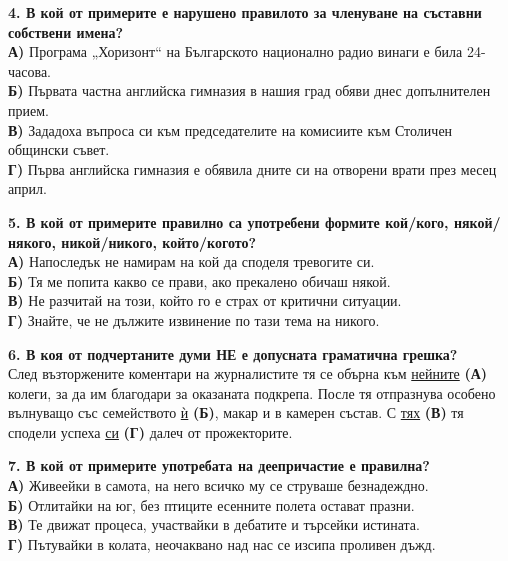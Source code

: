 \documentclass[12pt,a4paper]{article}
\begin{document}
\vspace{0.6cm}

\noindent
\textbf{4. В кой от примерите е нарушено правилото за членуване на съставни собствени имена?} \\
\textbf{А)} Програма „Хоризонт“ на Българското национално радио винаги е била 24-часова. \\
\textbf{Б)} Първата частна английска гимназия в нашия град обяви днес допълнителен прием. \\
\textbf{В)} Зададоха въпроса си към председателите на комисиите към Столичен общински съвет. \\
\textbf{Г)} Първа английска гимназия е обявила дните си на отворени врати през месец април.

\vspace{0.6cm}

\noindent
\textbf{5. В кой от примерите правилно са употребени формите кой/кого, някой/някого, никой/никого, който/когото?} \\
\textbf{А)} Напоследък не намирам на кой да споделя тревогите си. \\
\textbf{Б)} Тя ме попита какво се прави, ако прекалено обичаш някой. \\
\textbf{В)} Не разчитай на този, който го е страх от критични ситуации. \\
\textbf{Г)} Знайте, че не дължите извинение по тази тема на никого.

\vspace{0.6cm}

\noindent
\textbf{6. В коя от подчертаните думи НЕ е допусната граматична грешка?} \\
След възторжените коментари на журналистите тя се обърна към \underline{нейните} \textbf{(А)} колеги, за да им благодари за оказаната подкрепа. После тя отпразнува особено вълнуващо със семейството \underline{ѝ} \textbf{(Б)}, макар и в камерен състав. С \underline{тях} \textbf{(В)} тя сподели успеха \underline{си} \textbf{(Г)} далеч от прожекторите.

\vspace{0.6cm}

\noindent
\textbf{7. В кой от примерите употребата на деепричастие е правилна?} \\
\textbf{А)} Живеейки в самота, на него всичко му се струваше безнадеждно. \\
\textbf{Б)} Отлитайки на юг, без птиците есенните полета остават празни. \\
\textbf{В)} Те движат процеса, участвайки в дебатите и търсейки истината. \\
\textbf{Г)} Пътувайки в колата, неочаквано над нас се изсипа проливен дъжд.
\end{document}
